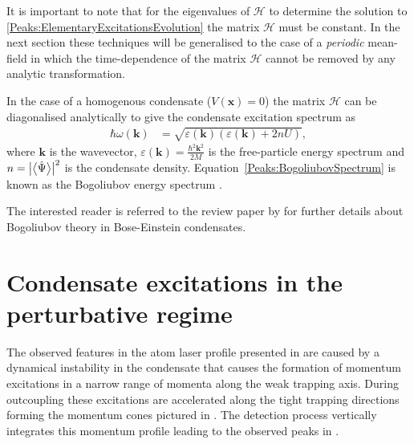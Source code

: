 It is important to note that for the eigenvalues of $\mathcal{H}$ to determine the solution to \eqref{Peaks:ElementaryExcitationsEvolution} the matrix $\mathcal{H}$ must be constant. In the next section these techniques will be generalised to the case of a \emph{periodic} mean-field in which the time-dependence of the matrix $\mathcal{H}$ cannot be removed by any analytic transformation.

In the case of a homogenous condensate ($V(\bm{x}) = 0$) the matrix $\mathcal{H}$ can be diagonalised analytically to give the condensate excitation spectrum as
\begin{align}
    \hbar \omega(\bm{k}) &= \sqrt{\varepsilon(\bm{k})\left(\varepsilon(\bm{k}) + 2 n U \right)},
    \label{Peaks:BogoliubovSpectrum}
\end{align}
where $\bm{k}$ is the wavevector, $\displaystyle \varepsilon(\bm{k}) = \frac{\hbar^2 \bm{k}^2}{2 M}$ is the free-particle energy spectrum and $n = \big|{\big<\hat{\Psi}\big>} \big|^2$ is the condensate density. Equation~\eqref{Peaks:BogoliubovSpectrum} is known as the Bogoliubov energy spectrum \citep{Bogoliubov:1947}.

The interested reader is referred to the review paper by \citet{Ozeri:2005} for further details about Bogoliubov theory in Bose-Einstein condensates.

\section{Condensate excitations in the perturbative regime}
\label{Peaks:PerturbativeApproach}

The observed features in the atom laser profile presented in  are caused by a dynamical instability in the condensate that causes the formation of momentum excitations in a narrow range of momenta along the weak trapping axis. During outcoupling these excitations are accelerated along the tight trapping directions forming the momentum cones pictured in . The detection process vertically integrates this momentum profile leading to the observed peaks in .

